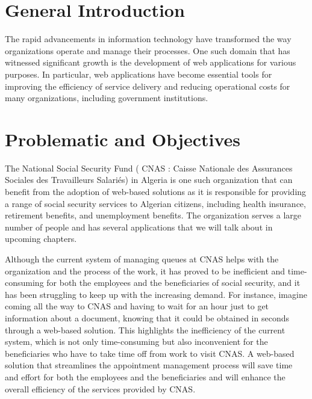 \section*{General Introduction}

The rapid advancements in information technology have transformed the way organizations operate and manage their processes. One such domain that has witnessed significant growth is the development of web applications for various purposes. In particular, web applications have become essential tools for improving the efficiency of service delivery and reducing operational costs for many organizations, including government institutions.

\section*{Problematic and Objectives}
The National Social Security Fund ( CNAS : Caisse Nationale des Assurances Sociales des Travailleurs Salariés) in Algeria is one such organization that can benefit from the adoption of web-based solutions as it is responsible for providing a range of social security services to Algerian citizens, including health insurance, retirement benefits, and unemployment benefits. The organization serves a large number of people and has several applications that we will talk about in upcoming chapters. 

Although the current system of managing queues at CNAS helps with the organization and the process of the work, it has proved to be inefficient and time-consuming for both the employees and the beneficiaries of social security, and it has been struggling to keep up with the increasing demand. For instance, imagine coming all the way to CNAS and having to wait for an hour just to get information about a document, knowing that it could be obtained in seconds through a web-based solution. This highlights the inefficiency of the current system, which is not only time-consuming but also inconvenient for the beneficiaries who have to take time off from work to visit CNAS. A web-based solution that streamlines the appointment management process will save time and effort for both the employees and the beneficiaries and will enhance the overall efficiency of the services provided by CNAS.

